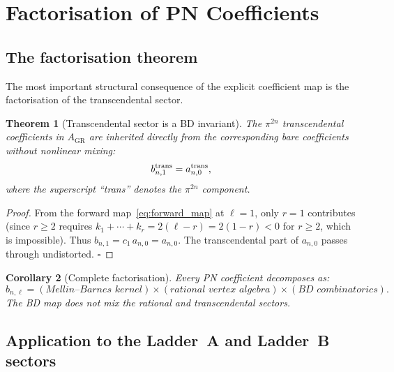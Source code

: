 \documentclass[11pt,a4paper]{article}
\theoremstyle{plain}
\newtheorem{theorem}{Theorem}[section]
\newtheorem{corollary}[theorem]{Corollary}
\theoremstyle{definition}
\theoremstyle{remark}
\newcommand{\GR}{\mathrm{GR}}
\begin{document}
\section{Factorisation of PN Coefficients}
\label{sec:factorisation}

\subsection{The factorisation theorem}

The most important structural consequence of the explicit coefficient map is the
factorisation of the transcendental sector.

\begin{theorem}[Transcendental sector is a BD invariant]
\label{thm:invariant}
The $\pi^{2n}$ transcendental coefficients in $A_\GR$ are inherited directly from
the corresponding bare coefficients without nonlinear mixing:
\begin{equation}
  b_{n,1}^{\rm trans} = a_{n,0}^{\rm trans},
  \label{eq:trans_invariant}
\end{equation}
where the superscript ``trans'' denotes the $\pi^{2n}$ component.
\end{theorem}

\begin{proof}
From the forward map~\eqref{eq:forward_map} at $\ell=1$, only $r=1$ contributes
(since $r \geq 2$ requires $k_1+\cdots+k_r = 2(\ell-r) = 2(1-r) < 0$ for $r\geq 2$,
which is impossible).  Thus $b_{n,1} = c_1\,a_{n,0} = a_{n,0}$.
The transcendental part of $a_{n,0}$ passes through undistorted.
\qquad $\square$
\end{proof}

\begin{corollary}[Complete factorisation]
Every PN coefficient decomposes as:
\begin{equation}
  b_{n,\ell} = (\textit{Mellin--Barnes kernel}) \times (\textit{rational vertex algebra})
  \times (\textit{BD combinatorics}).
\end{equation}
The BD map does not mix the rational and transcendental sectors.
\end{corollary}

\subsection{Application to the Ladder~A and Ladder~B sectors}
\end{document}
